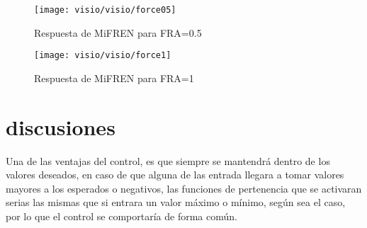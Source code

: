 \begin{figure}[h]
	\centering
	\texttt{[image: visio/visio/force05]}
		\caption{Respuesta de MiFREN para FRA=0.5}
	\label{fig:force0}
\end{figure}

\begin{figure}[h]
	\centering
	\texttt{[image: visio/visio/force1]}
	\caption{Respuesta de MiFREN para FRA=1}
	\label{fig:force1}
\end{figure}

\section{discusiones}

Una de las ventajas del control, es que siempre se mantendrá dentro de los valores deseados, en caso de que alguna de las entrada llegara a tomar valores mayores a los esperados o negativos, las funciones de pertenencia que se activaran serias las mismas que si entrara un valor máximo o mínimo, según sea el caso, por lo que el control se comportaría de forma común.


